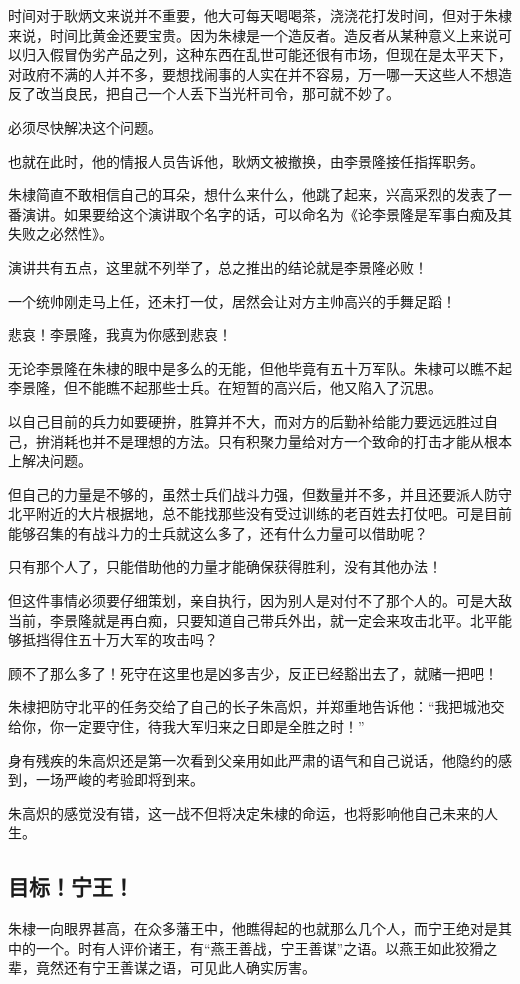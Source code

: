 \begin{multicols}{\theparacolNo}
		时间对于耿炳文来说并不重要，他大可每天喝喝茶，浇浇花打发时间，但对于朱棣来说，时间比黄金还要宝贵。因为朱棣是一个造反者。造反者从某种意义上来说可以归入假冒伪劣产品之列，这种东西在乱世可能还很有市场，但现在是太平天下，对政府不满的人并不多，要想找闹事的人实在并不容易，万一哪一天这些人不想造反了改当良民，把自己一个人丢下当光杆司令，那可就不妙了。

		必须尽快解决这个问题。

		也就在此时，他的情报人员告诉他，耿炳文被撤换，由李景隆接任指挥职务。

		朱棣简直不敢相信自己的耳朵，想什么来什么，他跳了起来，兴高采烈的发表了一番演讲。如果要给这个演讲取个名字的话，可以命名为《论李景隆是军事白痴及其失败之必然性》。

		演讲共有五点，这里就不列举了，总之推出的结论就是李景隆必败！

		一个统帅刚走马上任，还未打一仗，居然会让对方主帅高兴的手舞足蹈！

		悲哀！李景隆，我真为你感到悲哀！

		无论李景隆在朱棣的眼中是多么的无能，但他毕竟有五十万军队。朱棣可以瞧不起李景隆，但不能瞧不起那些士兵。在短暂的高兴后，他又陷入了沉思。

		以自己目前的兵力如要硬拚，胜算并不大，而对方的后勤补给能力要远远胜过自己，拚消耗也并不是理想的方法。只有积聚力量给对方一个致命的打击才能从根本上解决问题。

		但自己的力量是不够的，虽然士兵们战斗力强，但数量并不多，并且还要派人防守北平附近的大片根据地，总不能找那些没有受过训练的老百姓去打仗吧。可是目前能够召集的有战斗力的士兵就这么多了，还有什么力量可以借助呢？

		只有那个人了，只能借助他的力量才能确保获得胜利，没有其他办法！

		但这件事情必须要仔细策划，亲自执行，因为别人是对付不了那个人的。可是大敌当前，李景隆就是再白痴，只要知道自己带兵外出，就一定会来攻击北平。北平能够抵挡得住五十万大军的攻击吗？

		顾不了那么多了！死守在这里也是凶多吉少，反正已经豁出去了，就赌一把吧！

		朱棣把防守北平的任务交给了自己的长子朱高炽，并郑重地告诉他：“我把城池交给你，你一定要守住，待我大军归来之日即是全胜之时！”

		身有残疾的朱高炽还是第一次看到父亲用如此严肃的语气和自己说话，他隐约的感到，一场严峻的考验即将到来。

		朱高炽的感觉没有错，这一战不但将决定朱棣的命运，也将影响他自己未来的人生。

		\subsection{目标！宁王！}
		朱棣一向眼界甚高，在众多藩王中，他瞧得起的也就那么几个人，而宁王绝对是其中的一个。时有人评价诸王，有“燕王善战，宁王善谋”之语。以燕王如此狡猾之辈，竟然还有宁王善谋之语，可见此人确实厉害。


\end{multicols}
